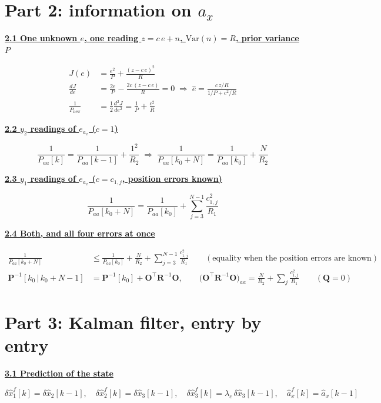\documentclass[11pt,a4paper]{ctexart}
\newcommand{\lc}{\lambda_c}
\newcommand{\hd}[1]{\par\medskip\noindent\underline{\textbf{#1}}\par\nobreak\vspace{0.2ex}}
\begin{document}
\section{Part 2: information on $a_x$}

\hd{2.1 One unknown $e$, one reading $z = c\,e + n$, $\mathrm{Var}(n) = R$, prior variance $P$}
\[
\begin{aligned}
J(e) &= \frac{e^2}{P} + \frac{(z - c\,e)^2}{R} \\
\frac{dJ}{de} &= \frac{2e}{P} - \frac{2c\,(z - c\,e)}{R} = 0
\;\Rightarrow\; \hat e = \frac{c\,z/R}{1/P + c^2/R} \\
\frac{1}{P_{\text{new}}} &= \frac{1}{2}\frac{d^2J}{de^2} = \frac{1}{P} + \frac{c^2}{R}
\end{aligned}
\]

\hd{2.2 $y_2$ readings of $e_{a_x}$ ($c = 1$)}
\[
\frac{1}{P_{aa}[k]} = \frac{1}{P_{aa}[k-1]} + \frac{1^2}{R_2}
\;\Rightarrow\; \frac{1}{P_{aa}[k_0+N]} = \frac{1}{P_{aa}[k_0]} + \frac{N}{R_2}
\]

\hd{2.3 $y_1$ readings of $e_{a_x}$ ($c = c_{1,j}$, position errors known)}
\[
\frac{1}{P_{aa}[k_0+N]} = \frac{1}{P_{aa}[k_0]} + \sum_{j=3}^{N-1}\frac{c_{1,j}^2}{R_1}
\]

\hd{2.4 Both, and all four errors at once}
\[
\begin{aligned}
\frac{1}{P_{aa}[k_0+N]} &\le \frac{1}{P_{aa}[k_0]} + \frac{N}{R_2} + \sum_{j=3}^{N-1}\frac{c_{1,j}^2}{R_1} \qquad (\text{equality when the position errors are known}) \\
\mathbf{P}^{-1}[k_0 \,|\, k_0+N-1] &= \mathbf{P}^{-1}[k_0] + \mathbf{O}^{\top}\mathbf{R}^{-1}\mathbf{O}, \qquad
\big(\mathbf{O}^{\top}\mathbf{R}^{-1}\mathbf{O}\big)_{aa} = \frac{N}{R_2} + \sum_{j}\frac{c_{1,j}^2}{R_1} \qquad (\mathbf{Q} = 0)
\end{aligned}
\]

\section{Part 3: Kalman filter, entry by entry}

\hd{3.1 Prediction of the state}
\[
\delta\hat x_1^f[k] = \delta\hat x_2[k-1], \quad
\delta\hat x_2^f[k] = \delta\hat x_3[k-1], \quad
\delta\hat x_3^f[k] = \lc\,\delta\hat x_3[k-1], \quad
\hat a_x^f[k] = \hat a_x[k-1]
\]
\end{document}
